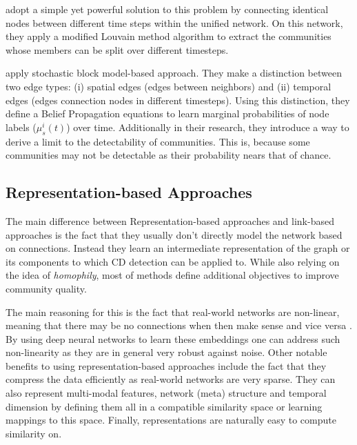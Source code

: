 \documentclass[
acmsmall,
nonacm,
screen,
acmthm]{../../scripts/pandoc/templates/acmart}
\begin{document}
\citet{muchaCommunityStructureTimeDependent2009} adopt a simple yet
powerful solution to this problem by connecting identical nodes between
different time steps within the unified network. On this network, they
apply a modified Louvain method algorithm to extract the communities
whose members can be split over different timesteps.

\citet{ghasemianDetectabilityThresholdsOptimal2016} apply stochastic
block model-based approach. They make a distinction between two edge
types: (i) spatial edges (edges between neighbors) and (ii) temporal
edges (edges connection nodes in different timesteps). Using this
distinction, they define a Belief Propagation equations to learn
marginal probabilities of node labels (\(\mu^i_s(t)\)) over time.
Additionally in their research, they introduce a way to derive a limit
to the detectability of communities. This is, because some communities
may not be detectable as their probability nears that of chance.

\hypertarget{representation-based-approaches}{%
\subsection{Representation-based
Approaches}\label{representation-based-approaches}}

The main difference between Representation-based approaches and
link-based approaches is the fact that they usually don't directly model
the network based on connections. Instead they learn an intermediate
representation of the graph or its components to which CD detection can
be applied to. While also relying on the idea of \emph{homophily}, most
of methods define additional objectives to improve community quality.

The main reasoning for this is the fact that real-world networks are
non-linear, meaning that there may be no connections when then make
sense and vice versa \citep{wangEvolutionaryAutoencoderDynamic2020}. By
using deep neural networks to learn these embeddings one can address
such non-linearity as they are in general very robust against noise.
Other notable benefits to using representation-based approaches include
the fact that they compress the data efficiently as real-world networks
are very sparse. They can also represent multi-modal features, network
(meta) structure and temporal dimension by defining them all in a
compatible similarity space or learning mappings to this space. Finally,
representations are naturally easy to compute similarity on.
\end{document}
